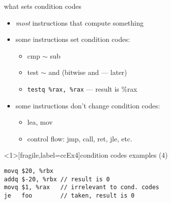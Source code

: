 
\begin{frame}[fragile,label=setCC]{what sets condition codes}
\begin{itemize}
\item \textit{most} instructions that compute something 
\item some instructions  set condition codes:
    \begin{itemize}
    \item {\keywordstyle cmp} $\sim$ {\keywordstyle sub}
    \item {\keywordstyle test} $\sim$ {\keywordstyle and} (bitwise and --- later)
    \item \lstinline|testq %rax, %rax| --- result is \%rax
    \end{itemize}
\item some instructions don't change condition codes:
    \begin{itemize}
    \item {\keywordstyle lea}, {\keywordstyle mov}
    \item control flow: {\keywordstyle jmp}, {\keywordstyle call}, {\keywordstyle ret}, {\keywordstyle jle}, etc.
    \end{itemize}
\end{itemize}
\end{frame}

\begin{frame}<1>[fragile,label=ccEx4]{condition codes examples (4)}
\begin{lstlisting}[language=myasm]
movq $20, %rbx
addq $-20, %rbx // result is 0
movq $1, %rax   // irrelevant to cond. codes
je   foo        // taken, result is 0
\end{lstlisting}
\end{frame}



